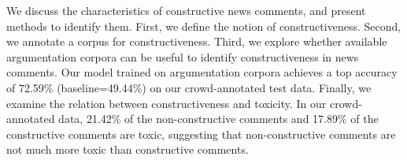We discuss the characteristics of constructive news comments, and present methods to identify them. First, we define the notion of constructiveness. Second, we annotate a corpus for constructiveness. Third, we explore whether available argumentation corpora can be useful to identify constructiveness in news comments. Our model trained on argumentation corpora achieves a top accuracy of 72.59\% (baseline=49.44\%) on our crowd-annotated test data. Finally, we examine the relation between constructiveness and toxicity. In our crowd-annotated data, 21.42\% of the non-constructive comments and 17.89\% of the constructive comments are toxic, suggesting that non-constructive comments are not much more toxic than constructive comments.
